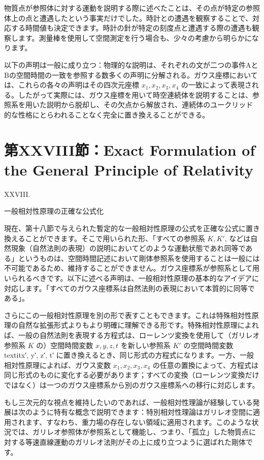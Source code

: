 \documentclass[a4paper,11pt,openany]{ltjsbook}
\begin{document}
物質点が参照体に対する運動を説明する際に述べたことは、その点が特定の参照体上の点と遭遇したという事実だけでした。時計との遭遇を観察することで、対応する時間値も決定できます。時計の針が特定の刻度点と遭遇する際の遭遇も観察します。測量棒を使用して空間測定を行う場合も、少々の考慮から明らかになります。

以下の声明は一般に成り立つ：物理的な説明は、それぞれの文が二つの事件AとBの空間時間の一致を参照する数多くの声明に分解される。ガウス座標においては、これらの各々の声明はその四次元座標 \(x_1, x_2, x_3, x_4\) の一致によって表現される。したがって実際には、ガウス座標を用いて時空連続体を説明することは、参照系を用いた説明から脱却し、その欠点から解放され、連続体のユークリッド的な性格にとらわれることなく完全に置き換えることができる。


\clearpage
\chapter{第XXVIII節：Exact Formulation of the General Principle of Relativity}

XXVIII.

一般相対性原理の正確な公式化

現在、第十八節で与えられた暫定的な一般相対性原理の公式を正確な公式に置き換えることができます。そこで用いられた形、「すべての参照系 $K, K′$, などは自然現象（自然法則の表現）の説明においてどのような運動状態であれ同等である」というものは、空間時間記述において剛体参照系を使用することは一般には不可能であるため、維持することができません。ガウス座標系が参照系として用いられるべきです。以下に述べる声明は、一般相対性原理の基本的なアイデアに対応します。「すべてのガウス座標系は自然法則の表現において本質的に同等である」。

さらにこの一般相対性原理を別の形で表すこともできます。これは特殊相対性原理の自然な拡張形式よりもより明確に理解できる形です。特殊相対性原理によれば、一般の自然法則を表現する方程式は、ローレンツ変換を使用して（ガリレオ参照系 $K$ の）空間時間変数 $x, y, z, t$ を新しい参照系 $K′$ の空間時間変数 \\textit{x′, y′, z′, t′} に置き換えるとき、同じ形式の方程式になります。一方、一般相対性原理によれば、ガウス変数 $x_1, x_2, x_3, x_4$ の任意の置換によって、方程式は同じ形式のものに変化する必要があります；すべての変換（ローレンツ変換だけではなく）は一つのガウス座標系から別のガウス座標系への移行に対応します。

もし三次元的な視点を維持したいのであれば、一般相対性理論が経験している発展は次のように特有な概念で説明できます：特別相対性理論はガリレオ空間に適用されます、すなわち、重力場の存在しない領域に適用されます。このような状況では、ガリレオ参照体が参照系として機能し、つまり、「孤立」した物質点に対する等速直線運動のガリレオ法則がその上に成り立つように選ばれた剛体です。
\end{document}
